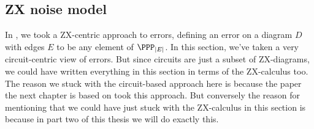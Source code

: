 \subsection{ZX noise model}

In , we took a ZX-centric approach to errors, defining an error on a diagram $D$ with edges $E$ to be any element of $\PPP_{|E|}$.
In this section, we've taken a very circuit-centric view of errors.
But since circuits are just a subset of ZX-diagrams, we could have written everything in this section in terms of the ZX-calculus too.
The reason we stuck with the circuit-based approach here is because the paper the next chapter is based on took this approach.
But conversely the reason for mentioning that we could have just stuck with the ZX-calculus in this section is because in part two of this thesis we will do exactly this.
